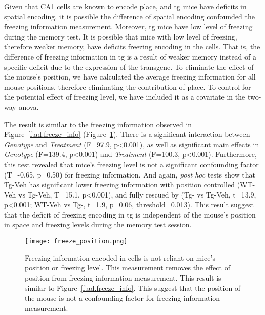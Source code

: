 Given that CA1 cells are known to encode place, and \gls{tg} mice have deficits in spatial encoding, it is possible the difference of spatial encoding confounded the freezing information measurement. Moreover, \gls{tg} mice have low level of freezing during the memory test. It is possible that mice with low level of freezing, therefore weaker memory, have deficits freezing encoding in the cells. That is, the difference of freezing information in \gls{tg} is a result of weaker memory instead of a specific deficit due to the expression of the transgene. To eliminate the effect of the mouse's position, we have calculated the average freezing information for all mouse positions, therefore eliminating the contribution of place. To control for the potential effect of freezing level, we have included it as a covariate in the two-way \gls{anova}. 

The result is similar to the freezing information observed in Figure~\ref{f.ad.freeze_info} (Figure~\ref{f.ad.freeze_ctrl}). There is a significant interaction between \textit{Genotype} and \textit{Treatment} (F=97.9, p<0.001), as well as significant main effects in \textit{Genotype} (F=139.4, p<0.001) and \textit{Treatment} (F=100.3, p<0.001). Furthermore, this test revealed that mice's freezing level is not a significant confounding factor (T=-0.65, p=0.50) for freezing information. And again, \textit{post hoc} tests show that Tg-Veh has significant lower freezing information with position controlled (WT-Veh vs Tg-Veh, T=15.1, p<0.001), and fully rescued by \tglu{} (Tg-\glu{} vs Tg-Veh, t=13.9, p<0.001; WT-Veh vs Tg-\glu, t=1.9, p=0.06, threshold=0.013). This result suggest that the deficit of freezing encoding in \gls{tg} is independent of the mouse's position in space and freezing levels during the memory test session.
\begin{figure}[h]
    \texttt{[image: freeze\_position.png]}
    \caption[Position-controlled freezing information.]{Freezing information encoded in cells is not reliant on mice's position or freezing level. This measurement removes the effect of position from freezing information measurement. This result is similar to Figure~\ref{f.ad.freeze_info}. This suggest that the position of the mouse is not a confounding factor for freezing information measurement. \label{f.ad.freeze_ctrl}}
\end{figure}

